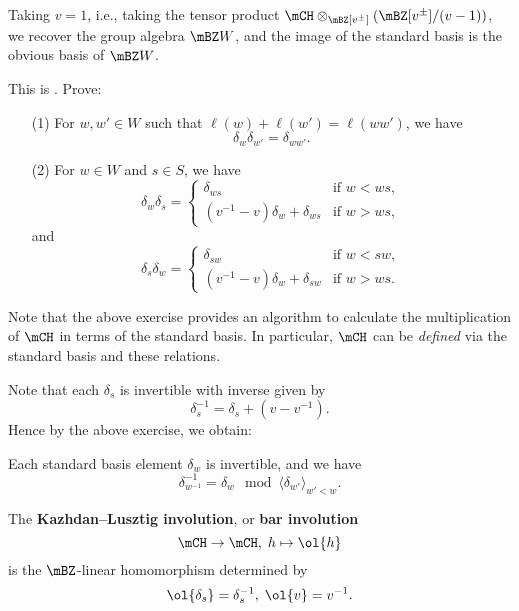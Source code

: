 \begin{rem}
	Taking $v=1$, i.e., taking the tensor product $\mCH \ot_{\mBZ[v^\pm]} (\mBZ[v^\pm]/(v-1))$, we recover the group algebra $\mBZ W$, and the image of the standard basis is the obvious basis of $\mBZ W$.
\end{rem}

\begin{exe}
	This is . Prove:
	\begin{itemize}
		\item[(1)]
			For $w,w'\in W$ such that $\ell(w)+\ell(w') = \ell(ww')$, we have
			\[
				\delta_w\delta_{w'} = \delta_{ww'}.
			\]
		\item[(2)]
			For $w\in W$ and $s\in S$, we have 
			\[
				\delta_w\delta_s = \left\{ 
					\begin{array}{rcl}  
						\delta_{ws}	&	\textrm{if } w< ws,\\
						(v^{-1}-v)\delta_{w} + \delta_{ws}	&	\textrm{if } w> ws,
					\end{array}\right.
			\]
			and
			\[
				\delta_s\delta_w = \left\{ 
					\begin{array}{rcl}  
						\delta_{sw}	&	\textrm{if } w< sw,\\
						(v^{-1}-v)\delta_{w} + \delta_{sw}	&	\textrm{if } w> ws.
					\end{array}\right.
			\]
	\end{itemize}
\end{exe}

\begin{rem}
	Note that the above exercise provides an algorithm to calculate the multiplication of $\mCH$ in terms of the standard basis. In particular, $\mCH$ can be \emph{defined} via the standard basis and these relations.
\end{rem}

	Note that each $\delta_s$ is invertible with inverse given by 
	\[
		\delta_s^{-1} = \delta_s + (v-v^{-1}).
	\]
	Hence by the above exercise, we obtain:

\begin{lem}
	Each standard basis element $\delta_w$ is invertible, and we have
	\[
		\delta_{w^{-1}}^{-1} = \delta_w \mod \langle \delta_{w'} \rangle_{w'<w}.
	\]
\end{lem}

\begin{defn}
	The \textbf{Kazhdan--Lusztig involution}, or \textbf{bar involution}
	\[
		\mCH \to \mCH,\; h\mapsto \ol{h}
	\]
	is the $\mBZ$-linear homomorphism determined by
	\[
		\ol{\delta_s} = \delta_s^{-1},\; \ol{v} = v^{-1}.
	\]
\end{defn}

